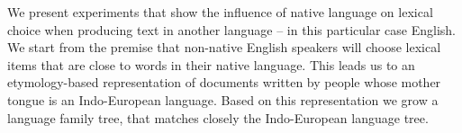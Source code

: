 We present experiments that show the influence of native language on lexical choice when producing text in another language -- in this particular case English. We start from the premise that non-native English speakers will choose lexical items that are close to words in their native language. This leads us to an etymology-based representation of documents written by people whose mother tongue is an Indo-European language. Based on this representation we grow a language family tree, that matches closely the Indo-European language tree.
